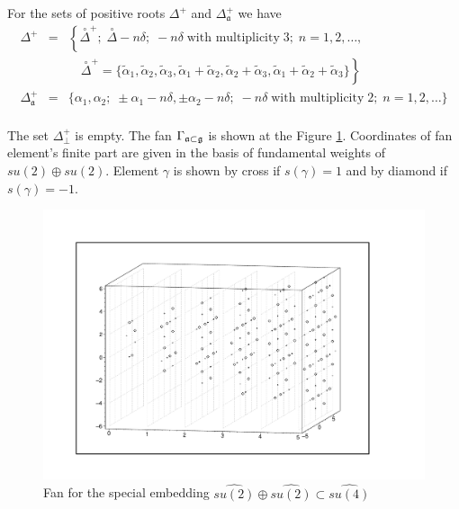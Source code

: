 \documentclass[a4paper,12pt]{article}
\theoremstyle{definition} \newtheorem{Def}{Definition}
\newcommand{\co}[1]{\overset{\circ }{#1}}
\begin{document}
For the sets of positive roots $\Delta^{+}$ and $\Delta_{\mathfrak{a}}^{+}$ we have
\begin{equation}
  \label{eq:38}
  \begin{array}{lll}
    \Delta^{+} &=&\left\{\co{\Delta}^{+};\; \co{\Delta}-n\delta;\;     -n\delta\;\mbox{with multiplicity}\; 3;\; n=1,2,\dots,\right. \\
    & & \quad\left.\co{\Delta}^{+}=\{\tilde{\alpha}_1, \tilde{\alpha}_2, \tilde{\alpha}_3, \tilde{\alpha}_1+\tilde{\alpha}_2, \tilde{\alpha}_2+\tilde{\alpha}_3, \tilde{\alpha}_1+\tilde{\alpha}_2+\tilde{\alpha}_3\}\right\}\\
    \Delta_{\mathfrak{a}}^{+} &=& \{  \alpha_1,\alpha_2;\;\pm \alpha_1-n\delta,\pm \alpha_2-n\delta;\; -n\delta\; \mbox{with multiplicity} \; 2;\; n=1,2,\dots\}\\
  \end{array}
\end{equation}

The set $\Delta^{+}_{\bot}$ is empty. 
The fan $\Gamma _{\frak{a}\subset \frak{g}}$ is shown at the Figure \ref{fig:A1+A1-A3_fan}. Coordinates of fan element's finite part are given in the basis of fundamental weights of $su(2)\oplus su(2)$. Element $\gamma$ is shown by cross if  $s(\gamma)=1$ and by diamond if $s(\gamma)=-1$.
\begin{figure}[h!tb]
  \includegraphics[width=150mm]{A1+A1-A3_fan.pdf}
  \caption{Fan for the special embedding $\widehat{su(2)}\oplus\widehat{su(2)}\subset \widehat{su(4)}$}
  \label{fig:A1+A1-A3_fan}
\end{figure}
\end{document}
